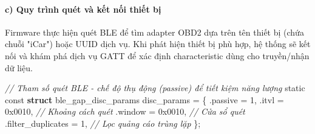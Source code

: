 \documentclass[a4paper]{extarticle}
\newenvironment{Shaded}{}{}
\newcommand{\BaseNTok}[1]{\textcolor[rgb]{0.25,0.63,0.44}{#1}}
\newcommand{\CommentTok}[1]{\textcolor[rgb]{0.38,0.63,0.69}{\textit{#1}}}
\newcommand{\DataTypeTok}[1]{\textcolor[rgb]{0.56,0.13,0.00}{#1}}
\newcommand{\DecValTok}[1]{\textcolor[rgb]{0.25,0.63,0.44}{#1}}
\newcommand{\KeywordTok}[1]{\textcolor[rgb]{0.00,0.44,0.13}{\textbf{#1}}}
\newcommand{\NormalTok}[1]{#1}
\newcommand{\OperatorTok}[1]{\textcolor[rgb]{0.40,0.40,0.40}{#1}}
\begin{document}
\paragraph{c) Quy trình quét và kết nối thiết
bị}\label{c-quy-truxecnh-quuxe9t-vuxe0-kux1ebft-nux1ed1i-thiux1ebft-bux1ecb}

Firmware thực hiện quét BLE để tìm adapter OBD2 dựa trên tên thiết bị
(chứa chuỗi "iCar") hoặc UUID dịch vụ. Khi phát hiện thiết bị phù hợp,
hệ thống sẽ kết nối và khám phá dịch vụ GATT để xác định characteristic
dùng cho truyền/nhận dữ liệu.

\begin{Shaded}
\begin{Highlighting}[]
\CommentTok{// Tham số quét BLE {-} chế độ thụ động (passive) để tiết kiệm năng lượng}
\DataTypeTok{static} \DataTypeTok{const} \KeywordTok{struct}\NormalTok{ ble\_gap\_disc\_params disc\_params }\OperatorTok{=} \OperatorTok{\{}
    \OperatorTok{.}\NormalTok{passive           }\OperatorTok{=} \DecValTok{1}\OperatorTok{,}
    \OperatorTok{.}\NormalTok{itvl              }\OperatorTok{=} \BaseNTok{0x0010}\OperatorTok{,}   \CommentTok{// Khoảng cách quét}
    \OperatorTok{.}\NormalTok{window            }\OperatorTok{=} \BaseNTok{0x0010}\OperatorTok{,}   \CommentTok{// Cửa sổ quét}
    \OperatorTok{.}\NormalTok{filter\_duplicates }\OperatorTok{=} \DecValTok{1}\OperatorTok{,}        \CommentTok{// Lọc quảng cáo trùng lặp}
\OperatorTok{\};}


\end{Highlighting}
\end{Shaded}
\end{document}
